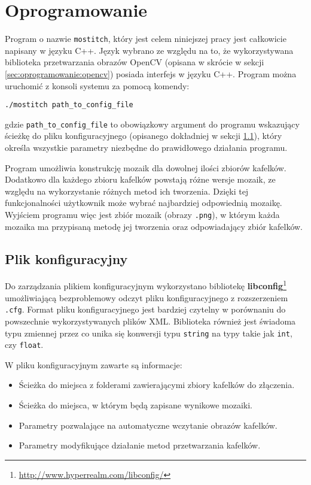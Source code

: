 %
\chapter{Oprogramowanie}
\label{sec:oprogramowanie:oprogramowanie}

Program o nazwie \texttt{mostitch}, który jest celem niniejszej pracy jest całkowicie napisany w języku C++. Język wybrano ze względu na to, że wykorzystywana biblioteka przetwarzania obrazów OpenCV (opisana w skrócie w sekcji \ref{sec:oprogramowanie:opencv}) posiada interfejs w języku C++. Program można uruchomić z konsoli systemu za pomocą komendy:

\begin{verbatim}
./mostitch path_to_config_file
\end{verbatim}

gdzie \texttt{path\_to\_config\_file} to obowiązkowy argument do programu wskazujący ścieżkę do pliku konfiguracyjnego (opisanego dokładniej w sekcji \ref{sec:oprogramowanie:plik_configuracyjny}), który określa wszystkie parametry niezbędne do prawidłowego działania programu.

Program umożliwia konstrukcję mozaik dla dowolnej ilości zbiorów kafelków. Dodatkowo dla każdego zbioru kafelków powstają różne wersje mozaik, ze względu na wykorzystanie różnych metod ich tworzenia. Dzięki tej funkcjonalności użytkownik może wybrać najbardziej odpowiednią mozaikę. Wyjściem programu więc jest zbiór mozaik (obrazy \texttt{.png}), w którym każda mozaika ma przypisaną metodę jej tworzenia oraz odpowiadający zbiór kafelków.

\section{Plik konfiguracyjny}
\label{sec:oprogramowanie:plik_configuracyjny}

Do zarządzania plikiem konfiguracyjnym wykorzystano bibliotekę \textbf{libconfig}\footnote{\url{http://www.hyperrealm.com/libconfig/}} umożliwiającą bezproblemowy odczyt pliku konfiguracyjnego z rozszerzeniem \texttt{.cfg}. Format pliku konfiguracyjnego jest bardziej czytelny w porównaniu do powszechnie wykorzystywanych plików XML. Biblioteka również jest świadoma typu zmiennej przez co unika się konwersji typu \texttt{string} na typy takie jak \texttt{int}, czy \texttt{float}.

W pliku konfiguracyjnym zawarte są informacje:

\begin{itemize}
\item Ścieżka do miejsca z folderami zawierającymi zbiory kafelków do złączenia.
\item Ścieżka do miejsca, w którym będą zapisane wynikowe mozaiki.
\item Parametry pozwalające na automatyczne wczytanie obrazów kafelków.
\item Parametry modyfikujące działanie metod przetwarzania kafelków.
\end{itemize}

